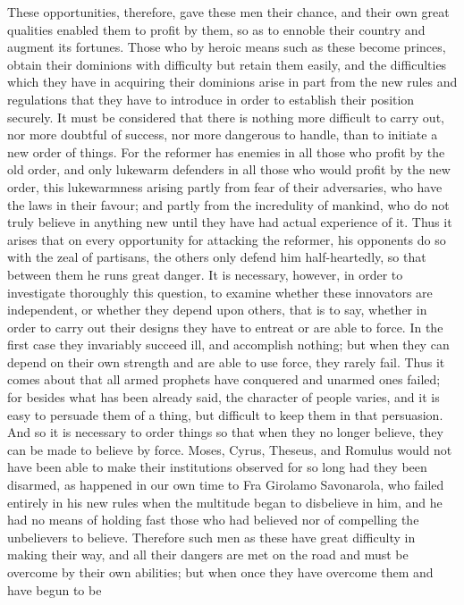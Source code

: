 \documentclass[12pt,letterpaper]{memoir}
\begin{document}
These opportunities, therefore, gave these men their chance, and their
own great qualities enabled them to profit by them, so as to ennoble
their country and augment its fortunes. Those who by heroic means such
as these become princes, obtain their dominions with difficulty but
retain them easily, and the difficulties which they have in acquiring
their dominions arise in part from the new rules and regulations that
they have to introduce in order to establish their position securely.
It must be considered that there is nothing more difficult to carry
out, nor more doubtful of success, nor more dangerous to handle, than
to initiate a new order of things. For the reformer has enemies in all
those who profit by the old order, and only lukewarm defenders in all
those who would profit by the new order, this lukewarmness arising
partly from fear of their adversaries, who have the laws in their
favour; and partly from the incredulity of mankind, who do not truly
believe in anything new until they have had actual experience of it.
Thus it arises that on every opportunity for attacking the reformer,
his opponents do so with the zeal of partisans, the others only defend
him half-heartedly, so that between them he runs great danger. It is
necessary, however, in order to investigate thoroughly this question,
to examine whether these innovators are independent, or whether they
depend upon others, that is to say, whether in order to carry out
their designs they have to entreat or are able to force. In the first
case they invariably succeed ill, and accomplish nothing; but when
they can depend on their own strength and are able to use force, they
rarely fail. Thus it comes about that all armed prophets have conquered
and unarmed ones failed; for besides what has been already said, the
character of people varies, and it is easy to persuade them of a thing,
but difficult to keep them in that persuasion. And so it is necessary
to order things so that when they no longer believe, they can be made
to believe by force. Moses, Cyrus, Theseus, and Romulus would not have
been able to make their institutions observed for so long had they
been disarmed, as happened in our own time to Fra Girolamo Savonarola,
who failed entirely in his new rules when the multitude began to
disbelieve in him, and he had no means of holding fast those who had
believed nor of compelling the unbelievers to believe. Therefore
such men as these have great difficulty in making their way, and all
their dangers are met on the road and must be overcome by their own
abilities; but when once they have overcome them and have begun to be
\end{document}
